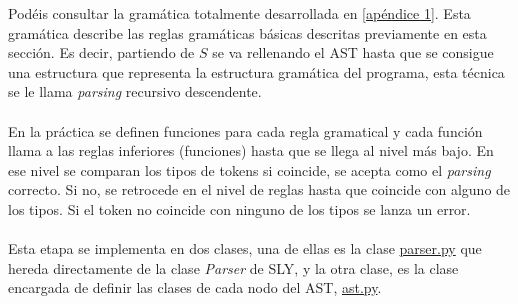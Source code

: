 Podéis consultar la gramática totalmente desarrollada en \ref{apéndice 1}. Esta gramática describe las reglas gramáticas básicas descritas previamente en esta sección. Es decir, partiendo de $S$ se va rellenando el AST hasta que se consigue una estructura que representa la estructura gramática del programa, esta técnica se le llama \textit{parsing} recursivo descendente.\\\\
En la práctica se definen funciones para cada regla gramatical y cada función llama a las reglas inferiores (funciones) hasta que se llega al nivel más bajo. En ese nivel se comparan los tipos de tokens si coincide, se acepta como el \textit{parsing} correcto. Si no, se retrocede en el nivel de reglas hasta que coincide con alguno de los tipos. Si el token no coincide con ninguno de los tipos se lanza un error.\\\\
\noindent Esta etapa se implementa en dos clases, una de ellas es la clase \href{https://github.com/domingoUnican/TFGPedroCastro/blob/main/code/compilerGoneFSR/gone/parser.py}{parser.py} que hereda directamente de la clase \textit{Parser} de SLY, y la otra clase, es la clase encargada de definir las clases de cada nodo del AST, \href{https://github.com/domingoUnican/TFGPedroCastro/blob/main/code/compilerGoneFSR/gone/ast.py}{ast.py}.
\newpage
